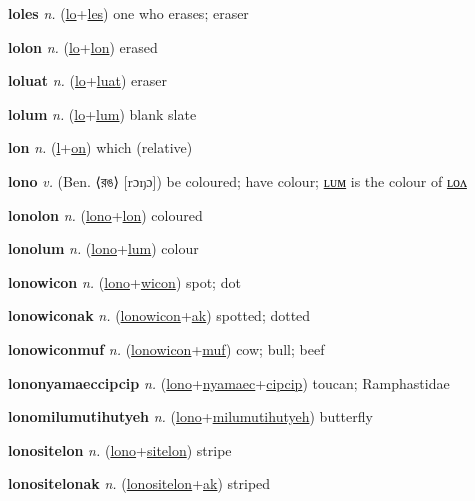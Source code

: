 \textbf{\hypertarget{loles}{loles}} \textit{n.} (\hyperlink{lo}{lo}+\allowbreak \hyperlink{les}{les})
one who erases; eraser

\textbf{\hypertarget{lolon}{lolon}} \textit{n.} (\hyperlink{lo}{lo}+\allowbreak \hyperlink{lon}{lon})
erased

\textbf{\hypertarget{loluat}{loluat}} \textit{n.} (\hyperlink{lo}{lo}+\allowbreak \hyperlink{luat}{luat})
eraser

\textbf{\hypertarget{lolum}{lolum}} \textit{n.} (\hyperlink{lo}{lo}+\allowbreak \hyperlink{lum}{lum})
blank slate

\textbf{\hypertarget{lon}{lon}} \textit{n.} (\hyperlink{l}{l}+\allowbreak \hyperlink{on}{on})
which (relative)

\textbf{\hypertarget{lono}{lono}} \textit{v.} (Ben. ⟨{\bengali{}রঙ}⟩ [rɔŋɔ])
be coloured; have colour; \hyperlink{lonolum}{ʟᴜᴍ} is the colour of \hyperlink{lonolon}{ʟᴏᴧ}

\textbf{\hypertarget{lonolon}{lonolon}} \textit{n.} (\hyperlink{lono}{lono}+\allowbreak \hyperlink{lon}{lon})
coloured

\textbf{\hypertarget{lonolum}{lonolum}} \textit{n.} (\hyperlink{lono}{lono}+\allowbreak \hyperlink{lum}{lum})
colour

\textbf{\hypertarget{lonowicon}{lonowicon}} \textit{n.} (\hyperlink{lono}{lono}+\allowbreak \hyperlink{wicon}{wicon})
spot; dot

\textbf{\hypertarget{lonowiconak}{lonowiconak}} \textit{n.} (\hyperlink{lonowicon}{lonowicon}+\allowbreak \hyperlink{ak}{ak})
spotted; dotted

\textbf{\hypertarget{lonowiconmuf}{lonowiconmuf}} \textit{n.} (\hyperlink{lonowicon}{lonowicon}+\allowbreak \hyperlink{muf}{muf})
cow; bull; beef

\textbf{\hypertarget{lononyamaeccipcip}{lononyamaeccipcip}} \textit{n.} (\hyperlink{lono}{lono}+\allowbreak \hyperlink{nyamaec}{nyamaec}+\allowbreak \hyperlink{cipcip}{cipcip})
toucan; Ramphastidae

\textbf{\hypertarget{lonomilumutihutyeh}{lonomilumutihutyeh}} \textit{n.} (\hyperlink{lono}{lono}+\allowbreak \hyperlink{milumutihutyeh}{milumutihutyeh})
butterfly

\textbf{\hypertarget{lonositelon}{lonositelon}} \textit{n.} (\hyperlink{lono}{lono}+\allowbreak \hyperlink{sitelon}{sitelon})
stripe

\textbf{\hypertarget{lonositelonak}{lonositelonak}} \textit{n.} (\hyperlink{lonositelon}{lonositelon}+\allowbreak \hyperlink{ak}{ak})
striped

